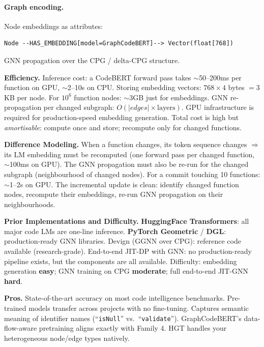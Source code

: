\documentclass[12pt,a4paper]{article}
\begin{document}
\paragraph{Graph encoding.}
Node embeddings as attributes:
\begin{lstlisting}
Node --HAS_EMBEDDING[model=GraphCodeBERT]--> Vector(float[768])
\end{lstlisting}
GNN propagation over the CPG / delta-CPG structure.

\begin{effbox}
\textbf{Efficiency.}
Inference cost: a CodeBERT forward pass takes $\sim$50--200ms per function
on GPU, $\sim$2--10s on CPU. Storing embedding vectors: $768 \times 4$ bytes
$= 3$KB per node. For $10^6$ function nodes: $\sim$3GB just for embeddings.
GNN re-propagation per changed subgraph: $O(|edges| \times \text{layers})$.
GPU infrastructure is required for production-speed embedding generation.
Total cost is high but \emph{amortisable}: compute once and store; recompute
only for changed functions.
\end{effbox}

\begin{diffbox}
\textbf{Difference Modeling.}
When a function changes, its token sequence changes $\Rightarrow$ its LM
embedding must be recomputed (one forward pass per changed function, $\sim$100ms
on GPU). The GNN propagation must also be re-run for the changed subgraph
(neighbourhood of changed nodes). For a commit touching 10 functions:
$\sim$1--2s on GPU. The incremental update is clean: identify changed function
nodes, recompute their embeddings, re-run GNN propagation on their
neighbourhoods.
\end{diffbox}

\begin{implbox}
\textbf{Prior Implementations and Difficulty.}
\textbf{HuggingFace Transformers}: all major code LMs are one-line inference.
\textbf{PyTorch Geometric} / \textbf{DGL}: production-ready GNN libraries.
Devign (GGNN over CPG): reference code available (research-grade).
End-to-end JIT-DP with GNN: no production-ready pipeline exists, but the
components are all available. Difficulty: embedding generation \textbf{easy};
GNN training on CPG \textbf{moderate}; full end-to-end JIT-GNN
\textbf{hard}.
\end{implbox}

\begin{prosbox}
\textbf{Pros.}
State-of-the-art accuracy on most code intelligence benchmarks.
Pre-trained models transfer across projects with no fine-tuning.
Captures semantic meaning of identifier names (``\texttt{isNull}'' vs.\
``\texttt{validate}''). GraphCodeBERT's data-flow-aware pretraining aligns
exactly with Family 4. HGT handles your heterogeneous node/edge types natively.
\end{prosbox}
\end{document}

